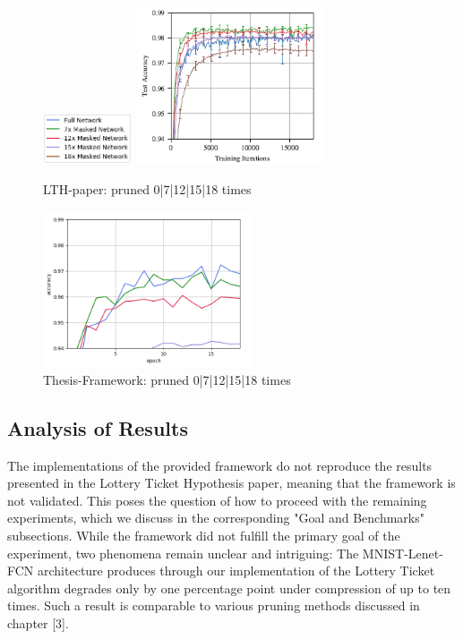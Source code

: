 \begin{figure}
	\begin{minipage}{\textwidth}
		\centering
		\includegraphics[width=100px]{gfx/7-Evaluation/LTH_2_legend.png}
	\end{minipage}
	\begin{minipage}{0.5\textwidth}
		\centering
		\includegraphics[height=175px]{gfx/7-Evaluation/LTH_2.png}
		\caption*{LTH-paper: pruned 0|7|12|15|18 times}
		\label{?}
	\end{minipage}\hfill
	\begin{minipage}{0.5\textwidth}
		\centering
		\includegraphics[height=175px]{gfx/Experiments/Reproduction-MNIST-FCN/accuracy/LTH_2.png}
		\caption*{Thesis-Framework: pruned 0|7|12|15|18 times}
		\label{?}
	\end{minipage}
\end{figure}
\subsection*{Analysis of Results}
The implementations of the provided framework do not reproduce the results presented in the Lottery Ticket Hypothesis paper, meaning that the framework is not validated. This poses the question of how to proceed with the remaining experiments, which we discuss in the corresponding "Goal and Benchmarks" subsections.
While the framework did not fulfill the primary goal of the experiment, two phenomena remain unclear and intriguing:
The MNIST-Lenet-FCN architecture produces through our implementation of the Lottery Ticket algorithm degrades only by one percentage point under compression of up to ten times. Such a result is comparable to various pruning methods discussed in chapter [3]. 

